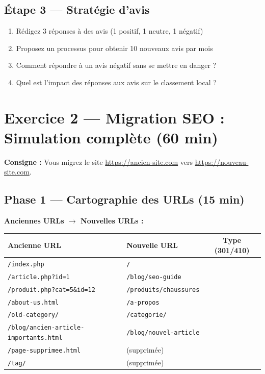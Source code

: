 \documentclass[12pt,a4paper]{report}
\begin{document}
\subsection{Étape 3 --- Stratégie d'avis}
\begin{enumerate}
\item Rédigez 3 réponses à des avis (1 positif, 1 neutre, 1 négatif)
\item Proposez un processus pour obtenir 10 nouveaux avis par mois
\item Comment répondre à un avis négatif sans se mettre en danger ?
\item Quel est l'impact des réponses aux avis sur le classement local ?
\end{enumerate}

\section{Exercice 2 --- Migration SEO : Simulation complète (60 min)}

\textbf{Consigne :} Vous migrez le site \url{https://ancien-site.com} vers \url{https://nouveau-site.com}.

\subsection{Phase 1 --- Cartographie des URLs (15 min)}

\textbf{Anciennes URLs $\rightarrow$ Nouvelles URLs :}

\begin{longtable}{|l|l|c|}
\hline
\textbf{Ancienne URL} & \textbf{Nouvelle URL} & \textbf{Type (301/410)} \\
\hline
\verb|/index.php| & \verb|/| & \\
\hline
\verb|/article.php?id=1| & \verb|/blog/seo-guide| & \\
\hline
\verb|/produit.php?cat=5&id=12| & \verb|/produits/chaussures| & \\
\hline
\verb|/about-us.html| & \verb|/a-propos| & \\
\hline
\verb|/old-category/| & \verb|/categorie/| & \\
\hline
\verb|/blog/ancien-article-importants.html| & \verb|/blog/nouvel-article| & \\
\hline
\verb|/page-supprimee.html| & (supprimée) & \\
\hline
\verb|/tag/| & (supprimée) & \\
\hline
\end{longtable}
\end{document}
